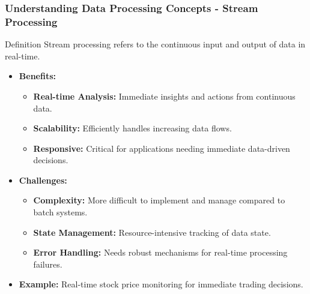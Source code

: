 \documentclass{beamer}
\begin{document}
\begin{frame}[fragile]
    \frametitle{Understanding Data Processing Concepts - Stream Processing}
    \begin{block}{Definition}
        Stream processing refers to the continuous input and output of data in real-time.
    \end{block}

    \begin{itemize}
        \item \textbf{Benefits:}
        \begin{itemize}
            \item \textbf{Real-time Analysis:} Immediate insights and actions from continuous data.
            \item \textbf{Scalability:} Efficiently handles increasing data flows.
            \item \textbf{Responsive:} Critical for applications needing immediate data-driven decisions.
        \end{itemize}
        
        \item \textbf{Challenges:}
        \begin{itemize}
            \item \textbf{Complexity:} More difficult to implement and manage compared to batch systems.
            \item \textbf{State Management:} Resource-intensive tracking of data state.
            \item \textbf{Error Handling:} Needs robust mechanisms for real-time processing failures.
        \end{itemize}
        
        \item \textbf{Example:} Real-time stock price monitoring for immediate trading decisions.
    \end{itemize}
\end{frame}
\end{document}
